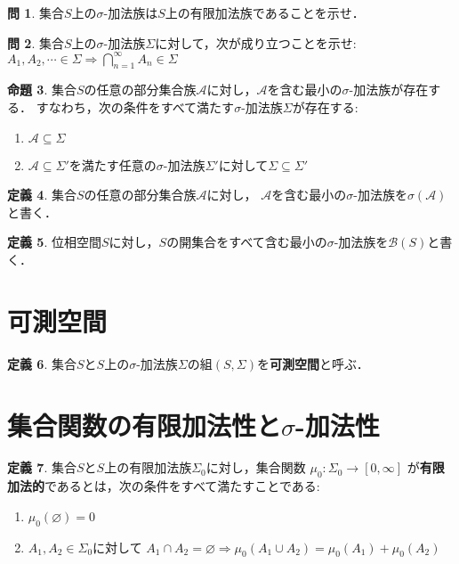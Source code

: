 \documentclass{jsreport}
\theoremstyle{definition}
\newtheorem{defi}{定義}[section]
\newtheorem{prop}[defi]{命題}
\newtheorem{qst}[defi]{問}
\begin{document}
\begin{qst}\label{qst_sigma_algebra_is_algebra}
集合$S$上の$\sigma$-加法族は$S$上の有限加法族であることを示せ．
\end{qst}

\begin{qst}\label{qst_countable_intersection}
集合$S$上の$\sigma$-加法族$\Sigma$に対して，次が成り立つことを示せ:
$A_1,A_2,\cdots\in\Sigma \Rightarrow \displaystyle \bigcap_{n=1}^\infty A_n\in\Sigma$
\end{qst}

\begin{prop}\label{prop_minimal_sigma_algebra}
集合$S$の任意の部分集合族$\mathcal{A}$に対し，$\mathcal{A}$を含む最小の$\sigma$-加法族が存在する．
すなわち，次の条件をすべて満たす$\sigma$-加法族$\Sigma$が存在する:
\begin{enumerate}
\item$\mathcal{A}\subseteq\Sigma$
\item$\mathcal{A}\subseteq\Sigma'$を満たす任意の$\sigma$-加法族$\Sigma'$に対して$\Sigma\subseteq\Sigma'$
\end{enumerate}
\end{prop}

\begin{defi}\label{def_minimal_sigma_algebra}
集合$S$の任意の部分集合族$\mathcal{A}$に対し，
$\mathcal{A}$を含む最小の$\sigma$-加法族を$\sigma(\mathcal{A})$と書く．
\end{defi}

\begin{defi}\label{def_Borel_set}
位相空間$S$に対し，$S$の開集合をすべて含む最小の$\sigma$-加法族を$\mathcal{B}(S)$と書く．
\end{defi}

\section{可測空間}

\begin{defi}\label{def_measurable_space}
集合$S$と$S$上の$\sigma$-加法族$\Sigma$の組$(S,\Sigma)$を\textbf{可測空間}と呼ぶ．
\end{defi}

\section{集合関数の有限加法性と$\sigma$-加法性}

\begin{defi}\label{def_additive}
集合$S$と$S$上の有限加法族$\Sigma_0$に対し，集合関数
$\mu_0\colon\Sigma_0\to[0,\infty]$
が\textbf{有限加法的}であるとは，次の条件をすべて満たすことである:
\begin{enumerate}
\item$\mu_0(\varnothing)=0$
\item$A_1,A_2\in\Sigma_0$に対して
$A_1 \cap A_2=\varnothing\Rightarrow\mu_0(A_1 \cup A_2)=\mu_0(A_1)+\mu_0(A_2)$
\end{enumerate}
\end{defi}
\end{document}
